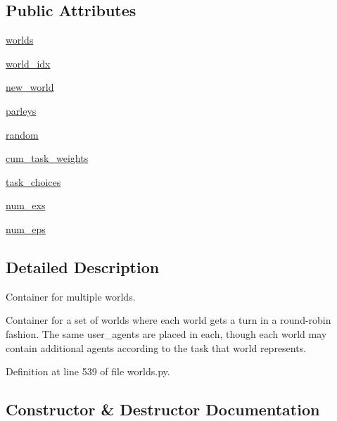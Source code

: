 \subsection*{Public Attributes}
\begin{DoxyCompactItemize}
\item 
\hyperlink{classparlai_1_1core_1_1worlds_1_1MultiWorld_afd4cbc3c724de6b6bf8f55e6fc56964e}{worlds}
\item 
\hyperlink{classparlai_1_1core_1_1worlds_1_1MultiWorld_a3d2a0158d96bed4eead1e3b4138d5242}{world\+\_\+idx}
\item 
\hyperlink{classparlai_1_1core_1_1worlds_1_1MultiWorld_ac88454a3fca862db7f00fb165b483dc5}{new\+\_\+world}
\item 
\hyperlink{classparlai_1_1core_1_1worlds_1_1MultiWorld_aa4332cdcbb6a8f91d55fbdeaa412cbe3}{parleys}
\item 
\hyperlink{classparlai_1_1core_1_1worlds_1_1MultiWorld_aa8e5d1fe78cd5ad37c142c95ff2a0a76}{random}
\item 
\hyperlink{classparlai_1_1core_1_1worlds_1_1MultiWorld_aa4264dd13f5d8e7f7883e3afd6d726e7}{cum\+\_\+task\+\_\+weights}
\item 
\hyperlink{classparlai_1_1core_1_1worlds_1_1MultiWorld_af84190b29a206943d32a09e70301a5a2}{task\+\_\+choices}
\item 
\hyperlink{classparlai_1_1core_1_1worlds_1_1MultiWorld_a97cb387aa6641126af73571731042ece}{num\+\_\+exs}
\item 
\hyperlink{classparlai_1_1core_1_1worlds_1_1MultiWorld_a6f874903b97f9bfd44354223ae38679e}{num\+\_\+eps}
\end{DoxyCompactItemize}


\subsection{Detailed Description}
\begin{DoxyVerb}Container for multiple worlds.

Container for a set of worlds where each world gets a turn in a round-robin fashion.
The same user_agents are placed in each, though each world may contain additional
agents according to the task that world represents.
\end{DoxyVerb}
 

Definition at line 539 of file worlds.\+py.



\subsection{Constructor \& Destructor Documentation}
\mbox{\label{classparlai_1_1core_1_1worlds_1_1MultiWorld_abe32f537dd97543bbfdf51d417d81d9b}} 
